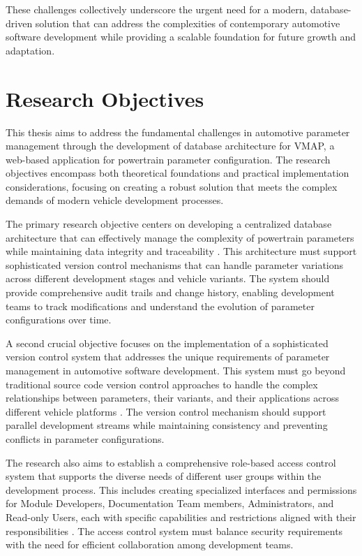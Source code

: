 These challenges collectively underscore the urgent need for a modern, database-driven solution that can address the complexities of contemporary automotive software development while providing a scalable foundation for future growth and adaptation.

\section{Research Objectives}
\label{sec:objectives}

This thesis aims to address the fundamental challenges in automotive parameter management through the development of database architecture for \ac{VMAP}, a web-based application for powertrain parameter configuration. The research objectives encompass both theoretical foundations and practical implementation considerations, focusing on creating a robust solution that meets the complex demands of modern vehicle development processes.

The primary research objective centers on developing a centralized database architecture that can effectively manage the complexity of powertrain parameters while maintaining data integrity and traceability \cite{bramer2015web}. This architecture must support sophisticated version control mechanisms that can handle parameter variations across different development stages and vehicle variants. The system should provide comprehensive audit trails and change history, enabling development teams to track modifications and understand the evolution of parameter configurations over time.

A second crucial objective focuses on the implementation of a sophisticated version control system that addresses the unique requirements of parameter management in automotive software development. This system must go beyond traditional source code version control approaches to handle the complex relationships between parameters, their variants, and their applications across different vehicle platforms \cite{staron2021automotive}. The version control mechanism should support parallel development streams while maintaining consistency and preventing conflicts in parameter configurations.

The research also aims to establish a comprehensive role-based access control system that supports the diverse needs of different user groups within the development process. This includes creating specialized interfaces and permissions for Module Developers, Documentation Team members, Administrators, and Read-only Users, each with specific capabilities and restrictions aligned with their responsibilities \cite{sandhu1998role}. The access control system must balance security requirements with the need for efficient collaboration among development teams.


